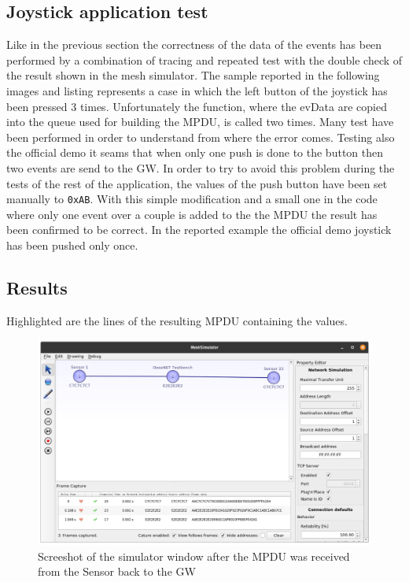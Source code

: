 \subsection{Joystick application test}
Like in the previous section the correctness of the data of the events has been performed by a combination of tracing and repeated test with the double check of the result shown in the mesh simulator. The sample reported in the following images and listing represents a case in which the left button of the joystick has been pressed 3 times.
Unfortunately the function, where the evData are copied into the queue used for building the MPDU, is called two times. Many test have been performed in order to understand from where the error comes.  Testing also the official demo it seams that when only one push is done to the button then two events are send to the GW. In order to try to avoid this problem during the tests of the rest of the application, the values of the push button have been set manually to \texttt{0xAB}. With this simple modification and a small one in the code where only one event over a couple is added to the the MPDU the result has been confirmed to be correct. In the reported example the official demo joystick has been pushed only once. 

\subsection{Results}
Highlighted are the lines of the resulting MPDU containing the values.
\begin{figure}[H]
	\centering
	\includegraphics[width=\linewidth]{images/three_clicks_simulation_mesh.png}
	\caption{Screeshot of the simulator window after the MPDU was received from the Sensor back to the GW}
	\label{fig:mesh}
\end{figure}

